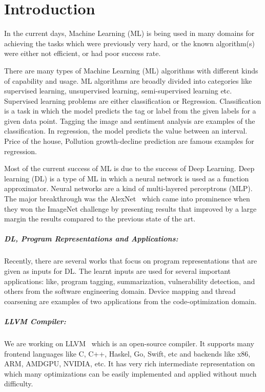 \chapter{Introduction}
\label{chap:intro}


In the current days, Machine Learning (ML) is being used in many domains for achieving the tasks which were previously very hard, or the known algorithm(s) were either not efficient, or had poor success rate. 


There are many types of Machine Learning (ML) algorithms with different kinds of capability and usage. 
ML algorithms are broadly divided into categories like supervised learning, unsupervised learning, semi-supervised learning etc. Supervised learning problems are either classification or Regression. Classification is a task in which the model predicts the tag or label from the given labels for a given data point. Tagging the image and sentiment analysis are examples of the classification. 
In regression, the model predicts the value between an interval. Price of the house, Pollution growth-decline prediction are famous examples for regression.

	
Most of the current success of ML is due to the success of Deep Learning. Deep learning (DL) is a type of ML in which a neural network is used as a function approximator. Neural networks are a kind of multi-layered perceptrons (MLP).  The major breakthrough was the AlexNet~\cite{alexnet:NIPS_2012} which came into prominence when they won the ImageNet challenge by presenting results that improved by a large margin the results compared to the previous state of the art.
	
\paragraph{DL, Program Representations and Applications:}
Recently, there are several works that focus on program representations that are given as inputs for DL. The learnt inputs are used for several important  applications: like, program tagging, summarization, vulnerability detection, and others from the software engineering domain. Device mapping and thread coarsening are examples of two applications from the code-optimization domain.

\paragraph{LLVM Compiler:}
We are working on LLVM~\cite{Lattner:2004:llvm} which is an open-source compiler. It supports many frontend languages like C, C++, Haskel, Go, Swift, etc and backends like x86, ARM, AMDGPU, NVIDIA, etc. It has very rich intermediate representation on which many optimizations can be easily implemented and applied without much difficulty.
	    
